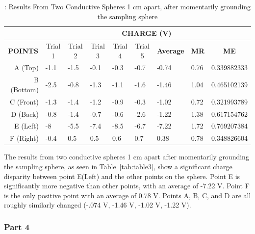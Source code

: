 \begin{table}[h]
    \caption{\label{tab:table 3}: Results From Two Conductive Spheres 1 cm apart, after momentarily grounding the sampling sphere}
    \centering
    \begin{tabular}{@{}rllllllll@{}}
    \toprule
    \multicolumn{1}{l}{} & \multicolumn{8}{c}{\textbf{CHARGE (V)}}                       \\ \midrule
    \multicolumn{1}{c}{\textbf{POINTS}} &
      \multicolumn{1}{c}{Trial 1} &
      \multicolumn{1}{c}{Trial 2} &
      \multicolumn{1}{c}{Trial 3} &
      \multicolumn{1}{c}{Trial 4} &
      \multicolumn{1}{c}{Trial 5} &
      \multicolumn{1}{c}{\textbf{Average}} &
      \multicolumn{1}{c}{\textbf{MR}} &
      \multicolumn{1}{c}{\textbf{ME}} \\
    A (Top)              & -1.1 & -1.5 & -0.1 & -0.3 & -0.7 & -0.74 & 0.76 & 0.339882333 \\
    B (Bottom)           & -2.5 & -0.8 & -1.3 & -1.1 & -1.6 & -1.46 & 1.04 & 0.465102139 \\
    C (Front)            & -1.3 & -1.4 & -1.2 & -0.9 & -0.3 & -1.02 & 0.72 & 0.321993789 \\
    D (Back)             & -0.8 & -1.4 & -0.7 & -0.6 & -2.6 & -1.22 & 1.38 & 0.617154762 \\
    E (Left)             & -8   & -5.5 & -7.4 & -8.5 & -6.7 & -7.22 & 1.72 & 0.769207384 \\
    F (Right)            & -0.4 & 0.5  & 0.5  & 0.6  & 0.7  & 0.38  & 0.78 & 0.348826604 \\ \bottomrule
    \end{tabular}
\end{table}

The results from two conductive spheres 1 cm apart after momentarily grounding the sampling sphere, as seen in Table~\ref{tab:table3}, show a significant charge disparity between point E(Left) and the other points on the sphere. Point E is significantly more negative than other points, with an average of -7.22 V. Point F is the only positive point with an average of 0.78 V. Points A, B, C, and D are all roughly similarly changed (-.074 V, -1.46 V, -1.02 V, -1.22 V).

\subsubsection{Part 4}

